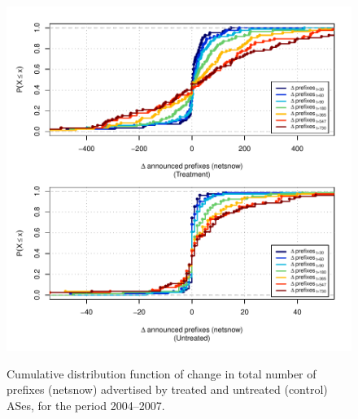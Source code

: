 \begin{figure}[H]
\begin{centering}
\begin{singlespace}
    \includegraphics[width=6in]{figures/behavior-netsnow-2004_2007-corr.pdf}
    \vspace{-2em}\\
    \caption{Cumulative distribution function of change in total number of
    prefixes (netsnow) advertised by treated and untreated (control) ASes, for
    the period 2004--2007.}
\end{singlespace}
\end{centering}
\end{figure}
